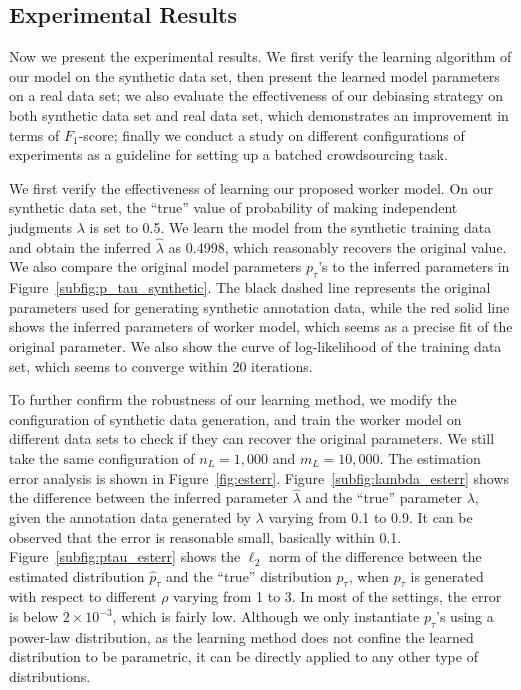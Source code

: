 \subsection{Experimental Results}
Now we present the experimental results.  
We first verify the learning algorithm of our model on the synthetic data set, 
then present the learned model parameters on a real data set; 
we also evaluate the effectiveness of our debiasing strategy on both synthetic data set and real data set, 
which demonstrates an improvement in terms of $F_1$-score; 
finally we conduct a study on different configurations of experiments 
as a guideline for setting up a batched crowdsourcing task.  

We first verify the effectiveness of learning our proposed worker model.  
On our synthetic data set, the ``true'' value of probability of making independent judgments $\lambda$ is set to 0.5.  
We learn the model from the synthetic training data and obtain the inferred $\hat{\lambda}$ as 0.4998, 
which reasonably recovers the original value.  
We also compare the original model parameters $p_{\tau}$'s to the inferred parameters in Figure~\ref{subfig:p_tau_synthetic}.  
The black dashed line represents the original parameters used for generating synthetic annotation data, 
while the red solid line shows the inferred parameters of worker model, 
which seems as a precise fit of the original parameter.  
We also show the curve of log-likelihood of the training data set,
which seems to converge within 20 iterations.  

To further confirm the robustness of our learning method, 
we modify the configuration of synthetic data generation, 
and train the worker model on different data sets to check if they can recover the original parameters.  
We still take the same configuration of $n_L = 1,000$ and $m_L = 10,000$.  
The estimation error analysis is shown in Figure~\ref{fig:esterr}.  
Figure~\ref{subfig:lambda_esterr} shows the difference between the inferred parameter $\hat{\lambda}$ 
and the ``true'' parameter $\lambda$, 
given the annotation data generated by $\lambda$ varying from 0.1 to 0.9.  
It can be observed that the error is reasonable small, basically within 0.1.  
Figure~\ref{subfig:ptau_esterr} shows the $\ell_2$ norm of the difference between the estimated distribution $\hat{p}_{\tau}$
and the ``true'' distribution $p_{\tau}$, 
when $p_{\tau}$ is generated with respect to different $\rho$ varying from 1 to 3.  
In most of the settings, the error is below $2 \times 10^{-3}$, 
which is fairly low.  
Although we only instantiate $p_{\tau}$'s using a power-law distribution, 
as the learning method does not confine the learned distribution to be parametric, 
it can be directly applied to any other type of distributions.  



